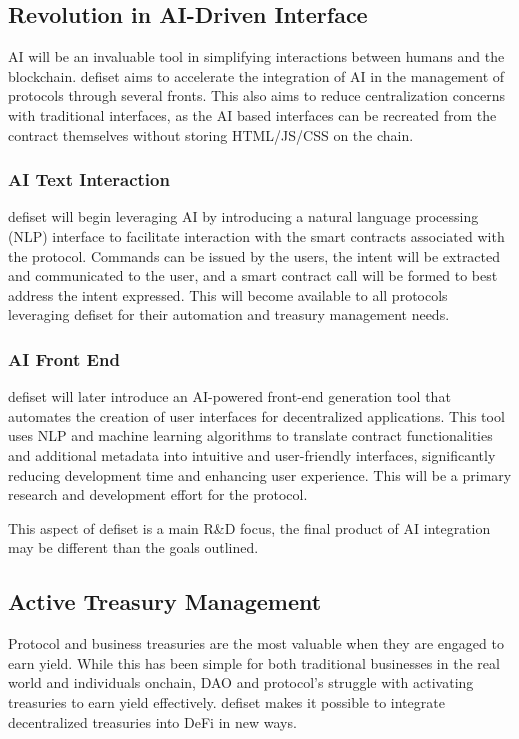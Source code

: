 \documentclass[11pt,oneside,a4paper]{article}
\begin{document}
\subsection{Revolution in AI-Driven Interface}

AI will be an invaluable tool in simplifying interactions between humans and the blockchain. defiset aims to accelerate the integration of AI in the management of protocols through several fronts. This also aims to reduce centralization concerns with traditional interfaces, as the AI based interfaces can be recreated from the contract themselves without storing HTML/JS/CSS on the chain.

\subsubsection{AI Text Interaction}
defiset will begin leveraging AI by introducing a natural language processing (NLP) interface to facilitate interaction with the smart contracts associated with the protocol. Commands can be issued by the users, the intent will be extracted and communicated to the user, and a smart contract call will be formed to best address the intent expressed. This will become available to all protocols leveraging defiset for their automation and treasury management needs.

\subsubsection{AI Front End}
defiset will later introduce an AI-powered front-end generation tool that automates the creation of user interfaces for decentralized applications. This tool uses NLP and machine learning algorithms to translate contract functionalities and additional metadata into intuitive and user-friendly interfaces, significantly reducing development time and enhancing user experience. This will be a primary research and development effort for the protocol.

 This aspect of defiset is a main R\&D focus, the final product of AI integration may be different than the goals outlined.

\subsection{Active Treasury Management}

Protocol and business treasuries are the most valuable when they are engaged to earn yield. While this has been simple for both traditional businesses in the real world and individuals onchain, DAO and protocol’s struggle with activating treasuries to earn yield effectively. defiset makes it possible to integrate decentralized treasuries into DeFi in new ways.
\end{document}
